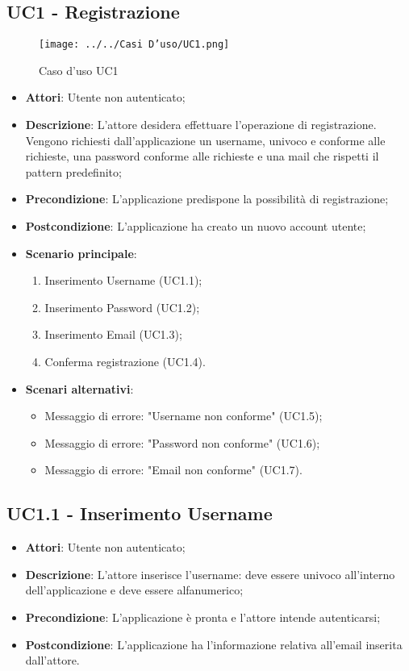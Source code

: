 \subsection{UC1 - Registrazione} 
\label{ssec:UC1} 
\begin{figure}[h!] 
\centering 
\texttt{[image: ../../Casi D'uso/UC1.png]} 
\caption{Caso d'uso UC1} 
 \end{figure} 
\begin{itemize} 
\item \textbf{Attori}: Utente non autenticato;
\item \textbf{Descrizione}: L'attore desidera effettuare l'operazione di registrazione. Vengono richiesti dall'applicazione un username, univoco e conforme alle richieste, una password conforme alle richieste e una mail che rispetti il pattern predefinito;
\item \textbf{Precondizione}: L'applicazione predispone la possibilità di registrazione;
\item \textbf{Postcondizione}: L'applicazione ha creato un nuovo account utente;
\item \textbf{Scenario principale}: \begin{enumerate}\item Inserimento Username (UC1.1);\item Inserimento Password (UC1.2);\item Inserimento Email (UC1.3);\item Conferma registrazione (UC1.4).
\end{enumerate}
\item \textbf{Scenari alternativi}: 
	\begin{itemize}
	\item Messaggio di errore: "Username non conforme" (UC1.5);\item Messaggio di errore: "Password non conforme" (UC1.6);\item Messaggio di errore: "Email non conforme" (UC1.7). 
	\end{itemize}
\end{itemize} 
\subsection{UC1.1 - Inserimento Username} 
\label{ssec:UC1.1} 
\begin{itemize} 
\item \textbf{Attori}: Utente non autenticato;
\item \textbf{Descrizione}: L’attore inserisce l'username: deve essere univoco all'interno dell'applicazione e deve essere alfanumerico;
\item \textbf{Precondizione}: L'applicazione è pronta e l'attore intende autenticarsi;
\item \textbf{Postcondizione}: L'applicazione ha l’informazione relativa all'email inserita dall’attore.
\end{itemize} 
